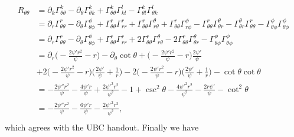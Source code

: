 \documentclass[12pt]{article}
\numberwithin{equation}{section}
\begin{document}
\begin{equation}
\begin{aligned}
R_{\theta \theta} &= \partial_k \Gamma^k_{\theta \theta} - \partial_\theta \Gamma^k_{\theta k} + \Gamma^k_{\theta \theta} \Gamma^l_{kl} - \Gamma^k_{\theta l} \Gamma^l_{\theta k} \\
&= \partial_r \Gamma^r_{\theta \theta} - \partial_\theta \Gamma^\phi_{\theta \phi} + \Gamma^r_{\theta \theta} \Gamma^r_{rr} + \Gamma^r_{\theta \theta} \Gamma^\theta_{r\theta} + \Gamma^r_{\theta \theta} \Gamma^\phi_{r\phi} - \Gamma^r_{\theta \theta} \Gamma^\theta_{\theta r} - \Gamma^\theta_{\theta r} \Gamma^r_{\theta \theta} - \Gamma^\phi_{\theta \phi} \Gamma^\phi_{\theta \phi} \\
&= \partial_r \Gamma^r_{\theta \theta} - \partial_\theta \Gamma^\phi_{\theta \phi} + \Gamma^r_{\theta \theta} \Gamma^r_{rr} + 2 \Gamma^r_{\theta \theta} \Gamma^\theta_{r\theta} - 2 \Gamma^r_{\theta \theta} \Gamma^\theta_{\theta r} - \Gamma^\phi_{\theta \phi} \Gamma^\phi_{\theta \phi} \\
&= \partial_r \Big( - \frac{2 \psi' r^2}{\psi} - r \Big) - \partial_\theta \cot \theta + \Big( - \frac{2 \psi' r^2}{\psi} - r \Big) \frac{2 \psi'}{\psi} \\
&+ 2 \Big( - \frac{2 \psi' r^2}{\psi} - r \Big) \Big( \frac{2 \psi'}{\psi}  + \frac{1}{r} \Big) - 2 \Big( - \frac{2 \psi' r^2}{\psi} - r \Big) \Big( \frac{2 \psi'}{\psi}  + \frac{1}{r} \Big) - \cot \theta \cot \theta \\
&=  - \frac{2 \psi'' r^2}{\psi} - \frac{4 \psi' r}{\psi} + \frac{2 \psi'^2 r^2}{\psi^2} - 1 + \csc^2 \theta - \frac{4 \psi'^2 r^2}{\psi^2} - \frac{2 r \psi'}{\psi} - \cot^2 \theta \\
&=  - \frac{2 \psi'' r^2}{\psi} - \frac{6 \psi' r}{\psi} - \frac{2 \psi'^2 r^2}{\psi^2}, \\
\end{aligned}
\end{equation}
which agrees with the UBC handout.  Finally we have
\end{document}
